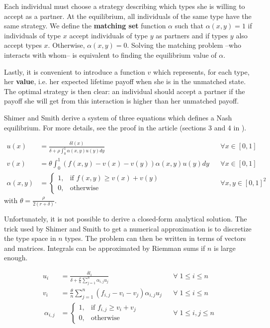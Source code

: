 Each individual must choose a strategy describing which types she is willing to accept as a partner. At the equilibrium, all individuals of the same type have the same strategy. We define the \textbf{matching set} function $\alpha$ such that $\alpha(x,y) = 1$ if individuals of type $x$ accept individuals of type $y$ as partners and if types $y$ also accept types $x$. Otherwise, $\alpha(x,y) = 0$. Solving the matching problem --who interacts with whom-- is equivalent to finding the equilibrium value of $\alpha$.

Lastly, it is convenient to introduce a function $v$ which represents, for each type, her \textbf{value}, i.e. her expected lifetime payoff when she is in the unmatched state. The optimal strategy is then clear: an individual should accept a partner if the payoff she will get from this interaction is higher than her unmatched payoff.

Shimer and Smith derive a system of three equations which defines a Nash equilibrium. For more details, see the proof in the article (sections 3 and 4 in \citep{shimer_assortative_2000}).

\begin{align*}[left=\empheqlbrace]
	u(x) &= \frac{\delta l(x)}{\delta + \rho \int_{0}^{1} \alpha(x,y) u(y) dy} &&\forall x \in [0,1]\\
	v(x) &= \theta \int_{0}^{1} (f(x,y)-v(x)-v(y)) \alpha(x,y) u(y) dy &&\forall x \in [0,1]\\
	\alpha(x,y) &=
	\begin{cases}
		1, & \text{if } f(x,y) \geq v(x)+v(y)\\
		0, & \text{otherwise}
	\end{cases}
	&&\forall x,y \in [0,1]^2 
\end{align*}
with $\theta = \frac{\rho}{2(r+\delta)}$.


Unfortunately, it is not possible to derive a closed-form analytical solution. The trick used by Shimer and Smith \citep{shimer_assortative_2000} to get a numerical approximation is to discretize the type space in $n$ types. The problem can then be written in terms of vectors and matrices. Integrals can be approximated by Riemman sums if $n$ is large enough.

\begin{align*}[left=\empheqlbrace]
	u_i &= \frac{\delta l_i}{\delta + \frac{\rho}{n} \sum\limits_{j=1}^{n} \alpha_{i,j} u_j} &&\forall \; 1 \leq i \leq n\\
	v_i &= \frac{\theta}{n} \sum_{j=1}^{n} (f_{i,j}-v_i-v_j) \alpha_{i,j} u_j &&\forall \; 1 \leq i \leq n\\\
	\alpha_{i,j} &=
	\begin{cases}
		1, & \text{if } f_{i,j} \geq v_i+v_j\\
		0, & \text{otherwise}
	\end{cases}
	&&\forall \; 1 \leq i,j \leq n\
\end{align*}


